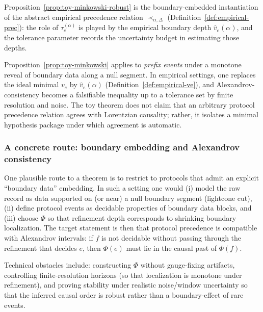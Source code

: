 \begin{remark}
Proposition~\ref{prop:toy-minkowski-robust} is the boundary-embedded instantiation of the abstract empirical precedence relation $\prec_{\alpha,\Delta}$ (Definition~\ref{def:empirical-prec}): the role of $\tau^{(\alpha)}_e$ is played by the empirical boundary depth $\widehat v_e(\alpha)$, and the tolerance parameter records the uncertainty budget in estimating those depths.
\end{remark}

\begin{remark}\label{rem:toy-scope}
Proposition~\ref{prop:toy-minkowski} applies to \emph{prefix events} under a monotone reveal of boundary data along a null segment. In empirical settings, one replaces the ideal minimal $v_e$ by $\widehat v_e(\alpha)$ (Definition~\ref{def:empirical-ve}), and Alexandrov-consistency becomes a falsifiable inequality up to a tolerance set by finite resolution and noise. The toy theorem does not claim that an arbitrary protocol precedence relation agrees with Lorentzian causality; rather, it isolates a minimal hypothesis package under which agreement is automatic.
\end{remark}

\subsubsection{A concrete route: boundary embedding and Alexandrov consistency}\label{sec:causality:alexandrov}
One plausible route to a theorem is to restrict to protocols that admit an explicit ``boundary data'' embedding. In such a setting one would (i) model the raw record as data supported on (or near) a null boundary segment (lightcone cut), (ii) define protocol events as decidable properties of boundary data blocks, and (iii) choose $\Phi$ so that refinement depth corresponds to shrinking boundary localization. The target statement is then that protocol precedence is compatible with Alexandrov intervals: if $f$ is not decidable without passing through the refinement that decides $e$, then $\Phi(e)$ must lie in the causal past of $\Phi(f)$.

Technical obstacles include: constructing $\Phi$ without gauge-fixing artifacts, controlling finite-resolution horizons (so that localization is monotone under refinement), and proving stability under realistic noise/window uncertainty so that the inferred causal order is robust rather than a boundary-effect of rare events.

